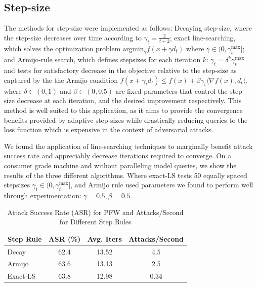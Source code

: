 \documentclass{article}
\begin{document}
\subsection{Step-size}
The methods for step-size were implemented as follows: 
 Decaying step-size, where the step-size decreases over time according to $\gamma_t = \frac{2}{t + 2}$; 
exact line-searching, which solves the optimization problem $\text{argmin}_{\gamma} f(x + \gamma d_t)$ where $\gamma \in (0,\gamma_t^\text{max}]$; 
and Armijo-rule search, which defines stepsizes for each iteration $k$: $\gamma_t = \delta^k \gamma_t^\text{max}$ and tests for satisfactory decrease  in the objective relative to the step-size as captured by the the Armijo condition $f(x + \gamma_t d_t) \leq f(x) + \beta \gamma_t \langle\nabla f(x), d_t\langle$, where $\delta \in (0,1)$ and $\beta \in (0, 0.5)$ are fixed parameters that control the step-size decrease at each iteration, and the desired improvement respectively. This method is well suited to this application, as it aims to provide the convergence benefits provided by adaptive step-sizes while drastically reducing queries to the loss function which is expensive in the context of adversarial attacks.

We found the application of line-searching techniques to marginally benefit attack success rate and appreciably decrease iterations required to converge. 
On a consumer grade machine and without paralleling model queries, we show the results of the three different algorithms. Where exact-LS tests 50 equally spaced stepsizes $\gamma_t \in (0, \gamma_t^\text{max}]$, and Armijo rule used parameters we found to perform well through experimentation: $\gamma = 0.5, \beta = 0.5$.

\begin{table}[H]
\centering
\begin{tabular}{lccc}
\toprule
\textbf{Step Rule} & \textbf{ASR (\%)} & \textbf{Avg. Iters} & \textbf{Attacks/Second} \\
\midrule
Decay  & 62.4 & 13.52 & 4.5 \\
Armijo & 63.6 & 13.13 & 2.5 \\
Exact-LS & 63.8 & 12.98 & 0.34 \\
\bottomrule
\end{tabular}
\caption{Attack Success Rate (ASR) for PFW and Attacks/Second for Different Step Rules}
\label{table:asr_step_rules}
\end{table}
\end{document}
